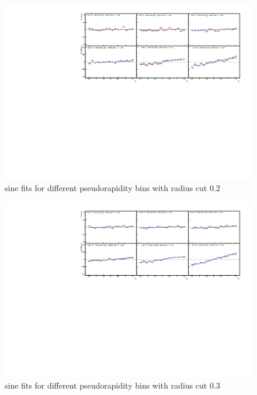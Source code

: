 \documentclass[letterpaper, abstract = on,listof=totoc, bibliography=totoc]{scrreprt}
\begin{document}
\begin{appendices}
\begin{figure}
\begin{center}
\includegraphics[width = 1\textwidth]{cone2Veta_fullEtaV2.pdf}
\caption[sine fits for different pseudorapidity bins with radius cut 0.2]{sine fits for different pseudorapidity bins with radius cut 0.2}
\label{}
\end{center}
\end{figure}


\begin{figure}
\begin{center}
\includegraphics[width = 1\textwidth]{cone3Veta_fullEtaV2.pdf}
\caption[sine fits for different pseudorapidity bins with radius cut 0.3]{sine fits for different pseudorapidity bins with radius cut 0.3}
\label{}
\end{center}
\end{figure}


\end{appendices}
\end{document}
